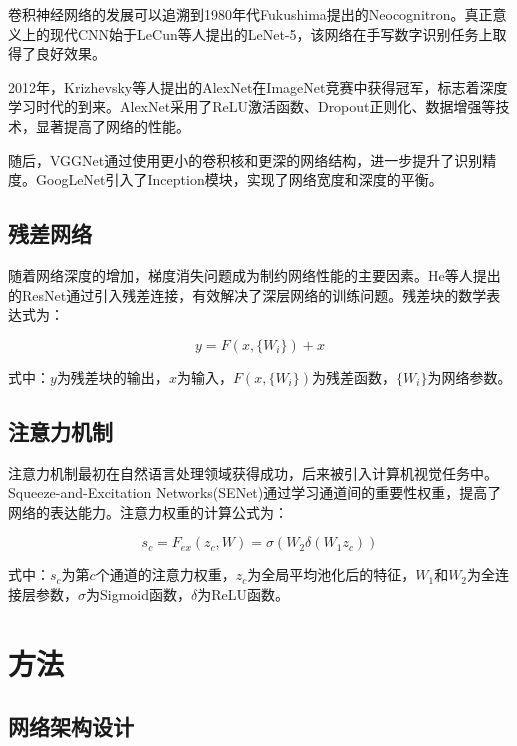 \documentclass[a4paper,12pt]{article}
\begin{document}
卷积神经网络的发展可以追溯到1980年代Fukushima提出的Neocognitron\cite{fukushima1988neocognitron}。真正意义上的现代CNN始于LeCun等人提出的LeNet-5\cite{lecun1998gradient}，该网络在手写数字识别任务上取得了良好效果。

2012年，Krizhevsky等人提出的AlexNet\cite{krizhevsky2012imagenet}在ImageNet竞赛中获得冠军，标志着深度学习时代的到来。AlexNet采用了ReLU激活函数、Dropout正则化、数据增强等技术，显著提高了网络的性能。

随后，VGGNet\cite{simonyan2014very}通过使用更小的卷积核和更深的网络结构，进一步提升了识别精度。GoogLeNet\cite{szegedy2015going}引入了Inception模块，实现了网络宽度和深度的平衡。

\subsection{残差网络}

随着网络深度的增加，梯度消失问题成为制约网络性能的主要因素。He等人提出的ResNet\cite{he2016deep}通过引入残差连接，有效解决了深层网络的训练问题。残差块的数学表达式为：

\begin{equation}
y = F(x, \{W_i\}) + x
\label{eq:residual}
\end{equation}

式中：$y$为残差块的输出，$x$为输入，$F(x, \{W_i\})$为残差函数，$\{W_i\}$为网络参数。

\subsection{注意力机制}

注意力机制最初在自然语言处理领域获得成功\cite{bahdanau2014neural}，后来被引入计算机视觉任务中。Squeeze-and-Excitation Networks(SENet)\cite{hu2018squeeze}通过学习通道间的重要性权重，提高了网络的表达能力。注意力权重的计算公式为：

\begin{equation}
s_c = F_{ex}(z_c, W) = \sigma(W_2 \delta(W_1 z_c))
\label{eq:attention}
\end{equation}

式中：$s_c$为第$c$个通道的注意力权重，$z_c$为全局平均池化后的特征，$W_1$和$W_2$为全连接层参数，$\sigma$为Sigmoid函数，$\delta$为ReLU函数。

\section{方法}

\subsection{网络架构设计}
\end{document}
